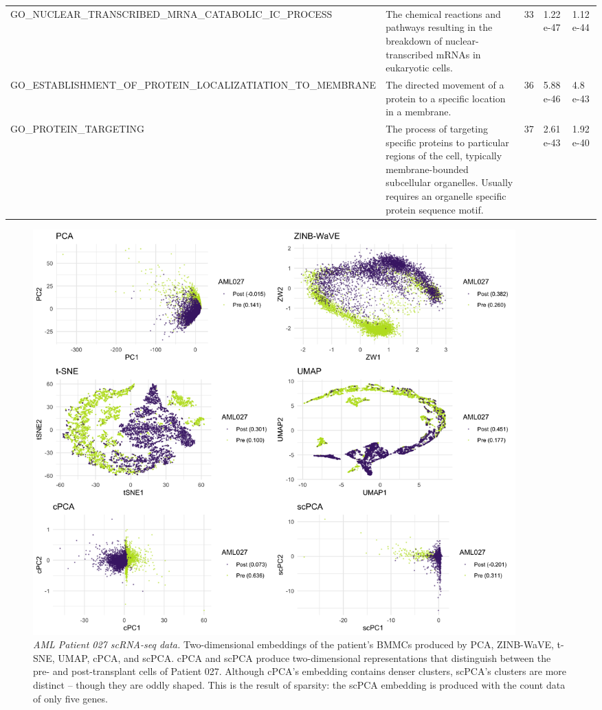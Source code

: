 \documentclass{article}
\begin{document}
\begin{table}
\begin{tabular}{|p{5cm} | p{6cm} | p{1.5cm} | p{1.5cm} | p{1.5cm}|}
  GO\_NUCLEAR\_TRANSCRIBED\_MRNA\_CATABOLIC\newline\_IC\_PROCESS & The chemical reactions and pathways resulting in the breakdown of nuclear-transcribed mRNAs in eukaryotic cells. & 33 & 1.22 e-47 & 1.12 e-44 \\
  GO\_ESTABLISHMENT\_OF\_PROTEIN\_LOCALIZATIATION\_TO\_MEMBRANE & The directed movement of a protein to a specific location in a membrane. & 36 & 5.88 e-46 & 4.8 e-43 \\
  GO\_PROTEIN\_TARGETING & The process of targeting specific proteins to particular regions of the cell, typically membrane-bounded subcellular organelles. Usually requires an organelle specific protein sequence motif. & 37 & 2.61 e-43 & 1.92 e-40 \\
 \hline
\end{tabular}
\label{tab:gsea_aml035}
\end{table}


\begin{figure}[!htbp]
  \centering
  \includegraphics[width=0.9\textwidth]{figures/aml027_results}
  \caption{
  {\em AML Patient 027 scRNA-seq data.} Two-dimensional embeddings of the patient's BMMCs produced by PCA, ZINB-WaVE, t-SNE, UMAP, cPCA, and scPCA. cPCA and scPCA produce two-dimensional representations that distinguish between the pre- and post-transplant cells of Patient 027. Although cPCA's embedding contains denser clusters, scPCA's clusters are more distinct -- though they are oddly shaped. This is the result of sparsity: the scPCA embedding is produced with the count data of only five genes.}
  \label{fig:comp_leuk_pat2}
\end{figure}
\end{document}

